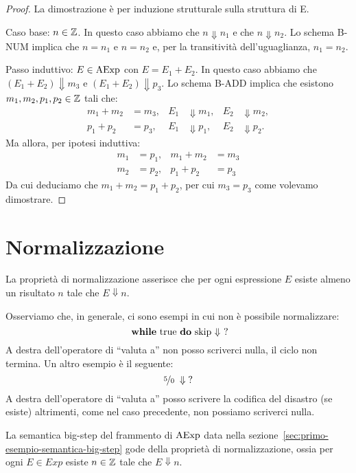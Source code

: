 \begin{proof}
La dimostrazione è per induzione strutturale sulla struttura di E.

Caso base: $n \in \mathbb{Z}$.
In questo caso abbiamo che $n \Downarrow n_1$ e che $n \Downarrow n_2$.
Lo schema B-NUM implica che $n = n_1$ e $n = n_2$ e,
per la transitività dell'uguaglianza, $n_1 = n_2$.

Passo induttivo: $E \in \mathrm{AExp}$ con $E = E_1 + E_2$.
In questo caso abbiamo che $(E_1 + E_2) \Downarrow m_3$
e $(E_1 + E_2) \Downarrow p_3$.
Lo schema B-ADD implica che esistono
$m_1, m_2, p_1, p_2 \in \mathbb{Z}$ tali che:
\begin{align*}
  m_1 + m_2 &= m_3, & E_1 &\Downarrow m_1, & E_2 &\Downarrow m_2, \\
  p_1 + p_2 &= p_3, & E_1 &\Downarrow p_1, & E_2 &\Downarrow p_2.
\end{align*}
Ma allora, per ipotesi induttiva:
\begin{align*}
m_1 &= p_1, & m_1+m_2 &= m_3 \\
m_2 &= p_2, & p_1 + p_2 &= p_3
\end{align*}
Da cui deduciamo che $ m_1 + m_2 = p_1 + p_2$, per cui
$m_3 = p_3$ come volevamo dimostrare.
\end{proof}

\section{Normalizzazione}
La proprietà di normalizzazione asserisce che per ogni espressione $E$ esiste almeno un risultato
$n$ tale che $E \Downarrow n$.

Osserviamo che, in generale, ci sono esempi in cui non è possibile normalizzare:
\[ \textrm{ $\mathop{\textup{\textbf{while}}}$ true $\mathop{\textup{\textbf{do}}}$ skip $\Downarrow$ ?} \]
A destra dell'operatore di ``valuta a'' non posso scriverci nulla, il ciclo non termina.
Un altro esempio è il seguente:
$$ \nicefrac{5}{0} \; \Downarrow \; ? $$
A destra dell'operatore di ``valuta a'' posso scrivere la codifica del disastro (se esiste)
altrimenti, come nel caso precedente, non possiamo scriverci nulla.

\begin{teorema}[Normalizzazione]
La semantica big-step del frammento di $\mathrm{AExp}$ data nella
sezione~\textup{\ref{sec:primo-esempio-semantica-big-step}}
gode della proprietà di normalizzazione, ossia per ogni
$E \in Exp$ esiste  $n \in \mathbb{Z}$ tale che $E \Downarrow n$.
\end{teorema}

